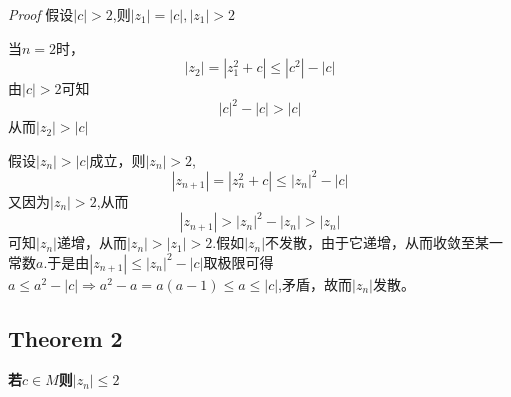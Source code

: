 \documentclass{ctexart}
\begin{document}
\textit{Proof}{} 假设$|c|>2$,则$|z_1|=|c|,|z_1|>2$\par
当$n=2$时，
$$|z_2|=|z_1^2+c|\le |c^2|-|c|$$
由$|c|>2$可知
$$|c|^2-|c|>|c|$$
从而$|z_2|>|c|$\par
假设$|z_n|>|c|$成立，则$|z_n|>2$,
$$|z_{n+1}|=|z_n^2+c|\le |z_n|^2-|c|$$
又因为$|z_n|>2$,从而
$$|z_{n+1}|>|z_n|^2-|z_n|>|z_n|$$
可知$|z_n|$递增，从而$|z_n|>|z_1|>2$.假如$|z_n|$不发散，由于它递增，从而收敛至某一常数$a$.于是由$|z_{n+1}|\le |z_n|^2-|c|$取极限可得$a\le a^2-|c|\Rightarrow a^2-a=a(a-1)\le a\le |c|$,矛盾，故而$|z_n|$发散。
\subsection{Theorem 2}
\textbf{若$c \in M$则$|z_n|\le 2$}
\end{document}
